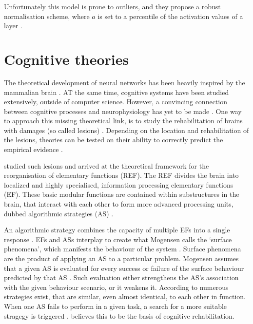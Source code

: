 \documentclass[report.tex]{subfiles}
\begin{document}
Unfortunately this model is prone to outliers, and they propose a robust normalisation scheme,
where $a$ is set to a percentile of the activation values of a layer \cite{Rueckauer2017}.

\section{Cognitive theories}
The theoretical development of neural networks has been heavily inspired
by the mammalian brain \cite{Russel2007, Nilsson2009}.
AT the same time, cognitive systems have been studied extensively, outside of computer science. 
However, a convincing connection between cognitive processes and neurophysiology
has yet to be made \cite{sep:cognitive-science, Nilsson2009, Robertson1999,
sep:cognitive-science, Walter2015}. 
One way to approach this missing theoretical link, is to study 
the rehabilitation of brains with damages (so called lesions)
\cite{Robertson1999, Mogensen2011, Pedersen2018:volr-report}.
Depending on the location and rehabilitation of the lesions, theories can
be tested on their ability to correctly predict the empirical evidence
\cite{Mogensen2011, Mogensen2012b}.

\citeauthor{Mogensen2012b} studied such lesions and arrived at the theoretical
framework for the reorganisation of elementary functions (\gls{REF}). 
The \gls{REF} divides the brain into localized and highly specialised,
information processing elementary functions (EF).
These basic modular functions are contained within substructures in the brain, 
that interact with each other to form more advanced processing units, dubbed
algorithmic strategies (AS) \autocite{Mogensen2011}.

An algorithmic strategy combines the capacity of multiple EFs into a single
response \cite{Mogensen2011, Mogensen2012b}.
EFs and ASs interplay to create what Mogensen calls the `surface phenomena',
which manifests the behaviour of the system \cite{Mogensen2011}.
Surface phenomena are the product of applying an AS to a particular problem. Mogensen assumes that a given AS is evaluated for every success or
failure of the surface behaviour predicted by that AS \cite{Mogensen2011}.
Such evaluation either strengthens the AS's association with the given
behaviour scenario, or it weakens it.
According to \citeauthor{Mogensen2011} numerous strategies exist, that are
similar, even almost identical, to each other in function.
When one AS fails to perform in a given task, a search for a more suitable
stragegy is triggered \cite{Mogensen2012b}.
\citeauthor{Mogensen2011} believes this to be the basis of cognitive
rehabilitation.
\end{document}
